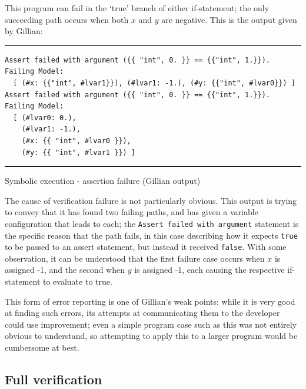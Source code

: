 This program can fail in the `true' branch of either if-statement; the only
succeeding path occurs when both $x$ and $y$ are negative. This is the output
given by Gillian:

\begin{listing}[!ht]
\noindent\rule{\textwidth}{0.5pt}
\vspace{-0.6cm}
\begin{verbatim}
Assert failed with argument ({{ "int", 0. }} == {{"int", 1.}}).
Failing Model:
  [ (#x: {{"int", #lvar1}}), (#lvar1: -1.), (#y: {{"int", #lvar0}}) ]
Assert failed with argument ({{ "int", 0. }} == {{"int", 1.}}).
Failing Model:
  [ (#lvar0: 0.),
    (#lvar1: -1.),
    (#x: {{ "int", #lvar0 }}),
    (#y: {{ "int", #lvar1 }}) ]
\end{verbatim}
\vspace{-0.4cm}
\noindent\rule{\textwidth}{0.5pt}
\vspace{-0.6cm}
\caption{Symbolic execution - assertion failure (Gillian output)}
\end{listing}

The cause of verification failure is not particularly obvious. This output is
trying to convey that it has found two failing paths, and has given a variable
configuration that leads to each; the \texttt{Assert failed with argument}
statement is the specific reason that the path fails, in this case describing
how it expects \texttt{true} to be passed to an assert statement, but instead it
received \texttt{false}. With some observation, it can be understood that the
first failure case occurs when $x$ is assigned -1, and the second when $y$ is
assigned -1, each causing the respective if-statement to evaluate to true.

This form of error reporting is one of Gillian's weak points; while it is very
good at finding such errors, its attempts at communicating them to the
developer could use improvement; even a simple program case such as this was
not entirely obvious to understand, so attempting to apply this to a larger
program would be cumbersome at best.

\subsection{Full verification}

